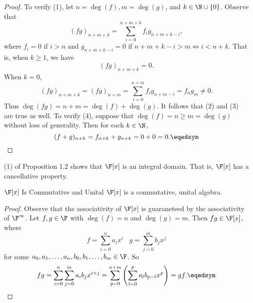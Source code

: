 \documentclass[math_245.tex]{subfiles}
\begin{document}
    \begin{proof}
        To verify (1), let $n=\deg(f), m=\deg(g)$, and $k\in \N\cup \left\lbrace 0 \right\rbrace$. Observe that
        \begin{equation*}
            (fg)_{n+m+k} = \sum^{n+m+k}_{i=0} f_ig_{n+m+k-i},
        \end{equation*}
        where $f_i=0$ if $i>n$ and $g_{n+m+k-i}=0$ if $n+m+k-i>m\iff i<n+k$. That is, when $k\geq 1$, we have
        \begin{equation*}
            (fg)_{n+m+k} = 0.
        \end{equation*}
        When $k=0$,
        \begin{equation*}
            (fg)_{n+m+k} = (fg)_{n+m} = \sum^{n+m}_{i=0} f_ig_{n+m-i} = f_ng_m \neq 0.
        \end{equation*}
        Thus $\deg(fg) = n+m = \deg(f) + \deg(g)$. It follows that (2) and (3) are true as well. To verify (4), suppose that $\deg(f) = n \geq m = \deg(g)$ without loss of generality. Then for each $k\in \N$,
        \begin{equation*}
            (f+g)_{n+k} = f_{n+k} + g_{n+k} = 0 + 0 = 0. \eqedsym
        \end{equation*}
    \end{proof}

    \begin{remark}
        (1) of Proposition 1.2 shows that $\F[x]$ is an integral domain. That is, $\F[x]$ has a cancellative property.
    \end{remark}

    \begin{cor}{$\F[x]$ Is Commutative and Unital}
        $\F[x]$ is a commutative, unital algebra.
    \end{cor}	

    \begin{proof}
        Observe that the associativity of $\F[x]$ is guaraneteed by the associativity of $\F^\infty$. Let $f,g\in \F$ with $\deg(f) = n$ and $\deg(g) = m$. Then $fg\in \F[x]$, where
        \begin{equation*}
            f = \sum^n_{i=0} a_ix^i \ \ \ \ g = \sum^m_{j=0} b_jx^j 
        \end{equation*}
        for some $a_0, a_1, \ldots, a_n, b_0, b_1, \ldots, b_m\in \F$. So
        \begin{equation*}
            fg = \sum^n_{i=0}\sum^m_{j=0} a_ib_jx^{i+j} = \sum^{n+m}_{p=0} \left( \sum^p_{l=0} a_lb_{p-l}x^p \right) = gf. \eqedsym
        \end{equation*}
    \end{proof}
\end{document}
